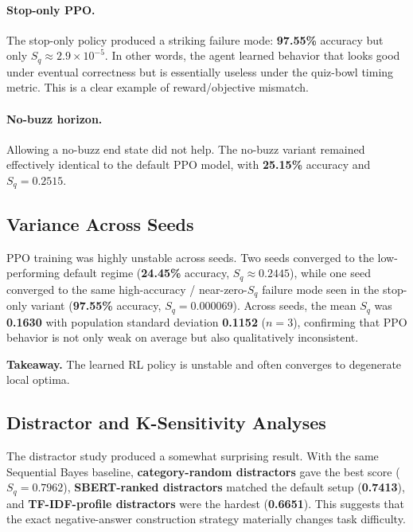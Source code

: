 \documentclass[11pt]{article}
\begin{document}
\paragraph{Stop-only PPO.}
The stop-only policy produced a striking failure mode: \textbf{97.55\%}
accuracy but only \textbf{$S_q \approx 2.9 \times 10^{-5}$}. In other words,
the agent learned behavior that looks good under eventual correctness but is
essentially useless under the quiz-bowl timing metric. This is a clear example
of reward/objective mismatch.

\paragraph{No-buzz horizon.}
Allowing a no-buzz end state did not help. The no-buzz variant remained
effectively identical to the default PPO model, with \textbf{25.15\%} accuracy
and \textbf{$S_q = 0.2515$}.

\subsection{Variance Across Seeds}

PPO training was highly unstable across seeds. Two seeds converged to the
low-performing default regime (\textbf{24.45\%} accuracy,
\textbf{$S_q \approx 0.2445$}), while one seed converged to the same
high-accuracy / near-zero-$S_q$ failure mode seen in the stop-only variant
(\textbf{97.55\%} accuracy, \textbf{$S_q = 0.000069$}). Across seeds, the mean
$S_q$ was \textbf{0.1630} with population standard deviation \textbf{0.1152} ($n=3$), confirming
that PPO behavior is not only weak on average but also qualitatively
inconsistent.

\noindent\textbf{Takeaway.} The learned RL policy is unstable and often
converges to degenerate local optima.

\subsection{Distractor and K-Sensitivity Analyses}

The distractor study produced a somewhat surprising result. With the same
Sequential Bayes baseline, \textbf{category-random distractors} gave the best
score (\textbf{$S_q = 0.7962$}), \textbf{SBERT-ranked distractors} matched the
default setup (\textbf{0.7413}), and \textbf{TF-IDF-profile distractors} were
the hardest (\textbf{0.6651}). This suggests that the exact negative-answer
construction strategy materially changes task difficulty.
\end{document}
